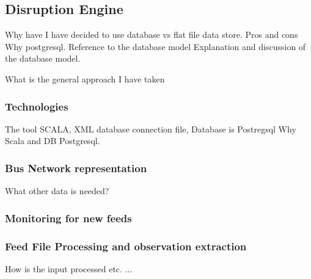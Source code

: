 \subsection{Disruption Engine}

Why have I have decided to use database vs flat file data store. Pros and cons
Why postgresql. Reference to the database model
Explanation and discussion of the database model.

What is the general approach I have taken
	\subsubsection{Technologies}
	The tool 
	SCALA, XML database connection file, Database is Postregsql
	Why Scala and DB Postgresql.
	\subsubsection{Bus Network representation}
	What other data is needed?
	\subsubsection{Monitoring for new feeds}
	
	\subsubsection{Feed File Processing and observation extraction}
	How is the input processed etc. ...
	
